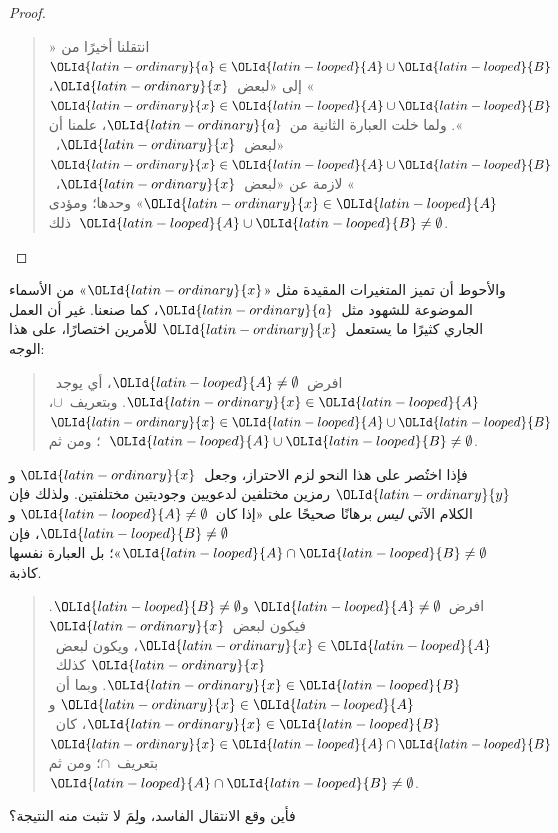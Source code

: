 \documentclass[../../../include/open-logic-section]{subfiles}
\begin{document}
\begin{proof}
  \begin{quote}
    انتقلنا أخيرًا من «${\OLId{latin-ordinary}{a}} \in {\OLId{latin-looped}{A}} \cup {\OLId{latin-looped}{B}}$» إلى «لبعض~${\OLId{latin-ordinary}{x}}$،
    ${\OLId{latin-ordinary}{x}} \in {\OLId{latin-looped}{A}} \cup {\OLId{latin-looped}{B}}$». ولما خلت العبارة الثانية من~${\OLId{latin-ordinary}{a}}$، علمنا أن
    «لبعض~${\OLId{latin-ordinary}{x}}$،~${\OLId{latin-ordinary}{x}} \in {\OLId{latin-looped}{A}} \cup {\OLId{latin-looped}{B}}$» لازمة عن «لبعض~${\OLId{latin-ordinary}{x}}$،~${\OLId{latin-ordinary}{x}} \in {\OLId{latin-looped}{A}}$»
    وحدها؛ ومؤدى ذلك~${\OLId{latin-looped}{A}} \cup {\OLId{latin-looped}{B}} \neq \emptyset$.
  \end{quote}
\end{proof}

والأحوط أن تميز المتغيرات المقيدة مثل «${\OLId{latin-ordinary}{x}}$» من الأسماء الموضوعة
للشهود مثل~${\OLId{latin-ordinary}{a}}$، كما صنعنا. غير أن العمل الجاري كثيرًا ما يستعمل~${\OLId{latin-ordinary}{x}}$
للأمرين اختصارًا، على هذا الوجه:
\begin{quote}
افرض~${\OLId{latin-looped}{A}} \neq \emptyset$، أي يوجد~${\OLId{latin-ordinary}{x}} \in {\OLId{latin-looped}{A}}$. وبتعريف~$\cup$،
${\OLId{latin-ordinary}{x}} \in {\OLId{latin-looped}{A}} \cup {\OLId{latin-looped}{B}}$؛ ومن ثم~${\OLId{latin-looped}{A}} \cup {\OLId{latin-looped}{B}} \neq \emptyset$.
\end{quote}
فإذا اختُصر على هذا النحو لزم الاحتراز، وجعل~${\OLId{latin-ordinary}{x}}$ و${\OLId{latin-ordinary}{y}}$ رمزين مختلفين
لدعويين وجوديتين مختلفتين. ولذلك فإن الكلام الآتي \emph{ليس} برهانًا
صحيحًا على «إذا كان~${\OLId{latin-looped}{A}} \neq \emptyset$ و${\OLId{latin-looped}{B}} \neq \emptyset$، فإن
${\OLId{latin-looped}{A}} \cap {\OLId{latin-looped}{B}} \neq \emptyset$»؛ بل العبارة نفسها كاذبة.
\begin{quote}
افرض~${\OLId{latin-looped}{A}} \neq \emptyset$ و${\OLId{latin-looped}{B}} \neq \emptyset$. فيكون لبعض~${\OLId{latin-ordinary}{x}}$
${\OLId{latin-ordinary}{x}} \in {\OLId{latin-looped}{A}}$، ويكون لبعض~${\OLId{latin-ordinary}{x}}$ كذلك~${\OLId{latin-ordinary}{x}} \in {\OLId{latin-looped}{B}}$. وبما أن~${\OLId{latin-ordinary}{x}} \in {\OLId{latin-looped}{A}}$ و
${\OLId{latin-ordinary}{x}} \in {\OLId{latin-looped}{B}}$، كان~${\OLId{latin-ordinary}{x}} \in {\OLId{latin-looped}{A}} \cap {\OLId{latin-looped}{B}}$ بتعريف~$\cap$؛ ومن ثم
${\OLId{latin-looped}{A}} \cap {\OLId{latin-looped}{B}} \neq \emptyset$.
\end{quote}
فأين وقع الانتقال الفاسد، ولِمَ لا تثبت منه النتيجة؟
\end{document}
